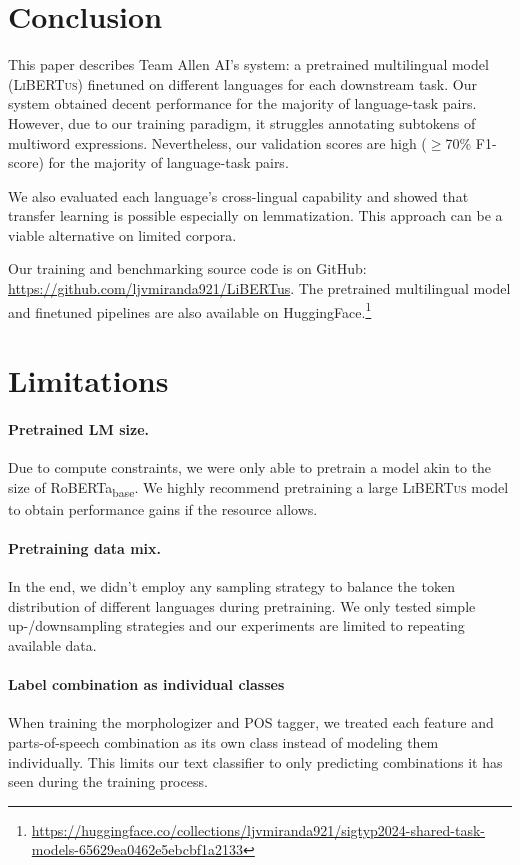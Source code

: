 \documentclass[11pt]{article}
\newcommand{\libertus}{\textsc{LiBERTus}}
\newcommand{\teamname}{Allen AI}
\newcommand{\githuburl}{\url{https://github.com/ljvmiranda921/LiBERTus}}
\begin{document}
\section{Conclusion}

This paper describes Team \teamname{}'s system: a pretrained multilingual model (\libertus{}) finetuned on different languages for each downstream task.
Our system obtained decent performance for the majority of language-task pairs.
However, due to our training paradigm, it struggles annotating subtokens of multiword expressions.
Nevertheless, our validation scores are high ($\geq$70\% F1-score) for the majority of language-task pairs.

We also evaluated each language's cross-lingual capability and showed that transfer learning is possible especially on lemmatization.
This approach can be a viable alternative on limited corpora.

Our training and benchmarking source code is on GitHub: \githuburl{}.
The pretrained multilingual model and finetuned pipelines are also available on HuggingFace.\footnote[2]{\url{https://huggingface.co/collections/ljvmiranda921/sigtyp2024-shared-task-models-65629ea0462e5ebcbf1a2133}}

\section*{Limitations}

\paragraph{Pretrained LM size.}
Due to compute constraints, we were only able to pretrain a model akin to the size of RoBERTa\textsubscript{base}.
We highly recommend pretraining a large \libertus{} model to obtain performance gains if the resource allows.

\paragraph{Pretraining data mix.}
In the end, we didn't employ any sampling strategy to balance the token distribution of different languages during pretraining.
We only tested simple up-/downsampling strategies and our experiments are limited to repeating available data.

\paragraph{Label combination as individual classes}
When training the morphologizer and POS tagger, we treated each feature and parts-of-speech combination as its own class instead of modeling them individually.
This limits our text classifier to only predicting combinations it has seen during the training process.
\end{document}
